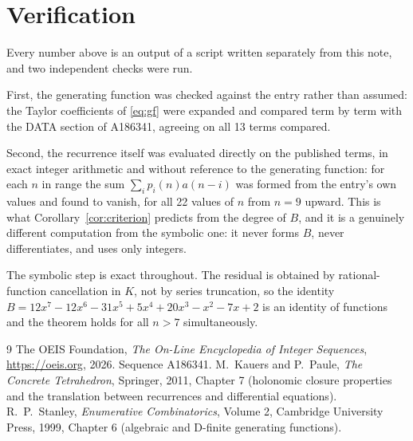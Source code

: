 \documentclass[11pt,a4paper]{article}
\theoremstyle{plain}
\theoremstyle{definition}
\begin{document}
\section{Verification}

Every number above is an output of a script written separately from this note, and two
independent checks were run.

First, the generating function was checked against the entry rather than assumed: the
Taylor coefficients of \eqref{eq:gf} were expanded and compared term by term with the DATA
section of A186341, agreeing on all 13 terms compared.

Second, the recurrence itself was evaluated directly on the published terms, in exact
integer arithmetic and without reference to the generating function: for each $n$ in range
the sum $\sum_{i}p_{i}(n)a(n-i)$ was formed from the entry's own values and found to
vanish, for all 22 values of $n$ from $n=9$ upward. This is what
Corollary~\ref{cor:criterion} predicts from the degree of $B$, and it is a genuinely
different computation from the symbolic one: it never forms $B$, never differentiates, and
uses only integers.

The symbolic step is exact throughout. The residual is obtained by rational-function
cancellation in $K$, not by series truncation, so the identity $B=12 x^{7} - 12 x^{6} - 31 x^{5} + 5 x^{4} + 20 x^{3} - x^{2} - 7 x + 2$ is an
identity of functions and the theorem holds for all $n>7$ simultaneously.

\begin{thebibliography}{9}
 The OEIS Foundation, \emph{The On-Line Encyclopedia of Integer Sequences},
\url{https://oeis.org}, 2026. Sequence A186341.
 M.~Kauers and P.~Paule, \emph{The Concrete Tetrahedron}, Springer, 2011,
Chapter 7 (holonomic closure properties and the translation between recurrences and
differential equations).
 R.~P.~Stanley, \emph{Enumerative Combinatorics}, Volume 2, Cambridge
University Press, 1999, Chapter 6 (algebraic and D-finite generating functions).
\end{thebibliography}
\end{document}
